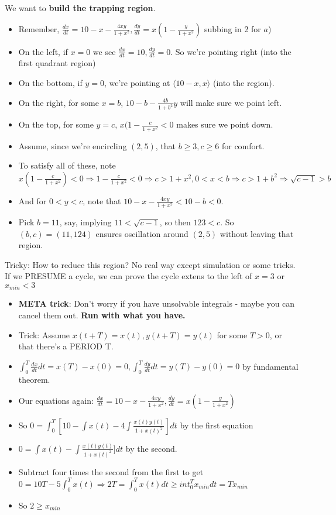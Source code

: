 \documentclass[11pt, oneside]{article}   	%
\begin{document}
We want to \textbf{build the trapping region}.   
\begin{itemize}
\item Remember, $\frac{dx}{dt} = 10 - x - \frac{4xy}{1+x^2}, \frac{dy}{dt} = x(1 - \frac{y}{1+x^2})$ subbing in 2 for $a$)
\item On the left, if $x = 0$ we see $\frac{dx}{dt} = 10, \frac{dy}{dt}  = 0$.  So we're pointing right (into the first quadrant region)
\item On the bottom, if $y = 0$, we're pointing at $\langle 10 -x , x \rangle$ (into the region).
\item On the right, for some $x = b$, $10 - b - \frac{4b}{1+b^2}y$ will make sure we point left.
\item On the top, for some $y = c$, $x(1-\frac{c}{1+x^2} < 0$ makes sure we point down.
\item Assume, since we're encircling $(2,5)$, that $b \geq 3, c \geq 6$ for comfort.
\item To satisfy all of these, note $x(1-\frac{c}{1+x^2}) < 0 \Rightarrow 1 - \frac{c}{1+x^2} < 0 \Rightarrow c > 1+x^2, 0 < x < b \Rightarrow c > 1+b^2 \Rightarrow  \sqrt{c - 1 } > b $ 
\item And for $0 < y < c$, note that $10 - x - \frac{4xy}{1+x^2} < 10 - b < 0. $ 
\item Pick $b = 11$, say, implying $11 < \sqrt{c-1}$, so then $123 < c$.  So $(b,c) = (11, 124)$ ensures oscillation around $(2,5)$ without leaving that region.
\end{itemize}

Tricky: How to reduce this region?  No real way except simulation or some tricks.   If we PRESUME a cycle, we can prove the cycle extens to the left of $x=3$ or $ x_{min} < 3$
\begin{itemize}
\item \textbf{META trick}: Don't worry if you have unsolvable integrals - maybe you can cancel them out.  \textbf{Run with what you have.}
\item Trick: Assume $x(t + T) = x(t), y(t + T) = y(t)$ for some $T>0$, or that there's a PERIOD T.
\item $\int_0^T \frac{dx}{dt}dt = x(T) - x(0) = 0, \int_0^T \frac{dy}{dt}dt = y(T) - y(0) = 0$ by fundamental theorem.
\item Our equations again:  $\frac{dx}{dt} = 10 - x - \frac{4xy}{1+x^2}, \frac{dy}{dt} = x(1 - \frac{y}{1+x^2})$
\item So $0 = \int_0^T [10 - \int x(t) - 4\int \frac{x(t)y(t)} {1+x(t)^2}]dt$ by the first equation
\item $0 = \int x(t) - \int \frac{x(t)y(t)} {1+x(t)^2}]dt$ by the second.
\item Subtract four times the second from the first to get $0 = 10T - 5 \int_0^T x(t) \Rightarrow 2T = \int_0^T x(t)dt \geq int_0^T x_{min}dt = Tx_{min}$
\item So $2 \geq x_{min}$
\end{itemize}
\end{document}
